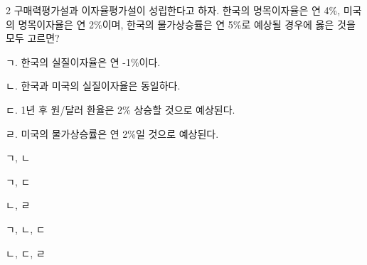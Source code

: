\begin{question}{2}
구매력평가설과 이자율평가설이 성립한다고 하자. 한국의 명목이자율은 연 4\%, 미국의 명목이자율은 연 2\%이며, 한국의 물가상승률은 연 5\%로 예상될 경우에 옳은 것을 모두 고르면?
\begin{framedtext}
ㄱ. 한국의 실질이자율은 연 -1\%이다. \par
ㄴ. 한국과 미국의 실질이자율은 동일하다. \par
ㄷ. 1년 후 원/달러 환율은 2\% 상승할 것으로 예상된다. \par
ㄹ. 미국의 물가상승률은 연 2\%일 것으로 예상된다. \par
\end{framedtext}
\begin{choices}
  \item ㄱ, ㄴ
  \item ㄱ, ㄷ
  \item ㄴ, ㄹ
  \item ㄱ, ㄴ, ㄷ
  \item ㄴ, ㄷ, ㄹ
\end{choices}
\end{question}
